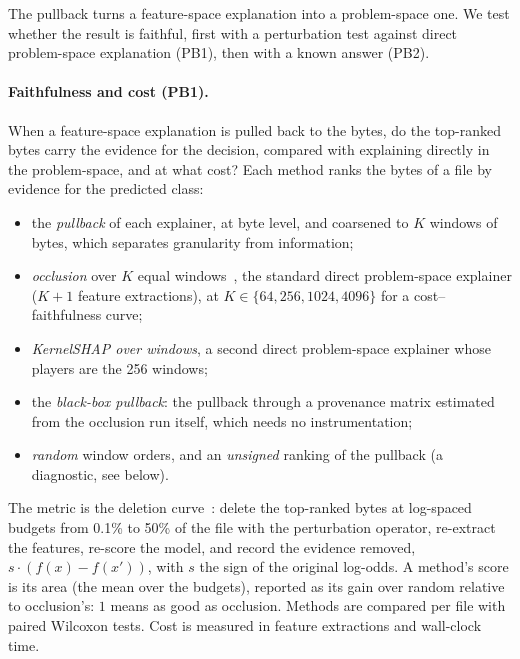 The pullback turns a feature-space explanation into a problem-space one. We test whether the result is faithful, first with a perturbation test against direct problem-space explanation (PB1), then with a known answer (PB2).

\paragraph{Faithfulness and cost (PB1).} When a feature-space explanation is pulled back to the bytes, do the top-ranked bytes carry the evidence for the decision, compared with explaining directly in the problem-space, and at what cost? Each method ranks the bytes of a file by evidence for the predicted class:
\begin{itemize}[noitemsep, topsep=2pt]
    \item the \textit{pullback} of each explainer, at byte level, and coarsened to $K$ windows of bytes, which separates granularity from information;
    \item \textit{occlusion} over $K$ equal windows~\cite{zeiler2014visualizing}, the standard direct problem-space explainer ($K + 1$ feature extractions), at $K \in \{64, 256, 1024, 4096\}$ for a cost--faithfulness curve;
    \item \textit{KernelSHAP over windows}, a second direct problem-space explainer whose players are the 256 windows;
    \item the \textit{black-box pullback}: the pullback through a provenance matrix estimated from the occlusion run itself, which needs no instrumentation;
    \item \textit{random} window orders, and an \textit{unsigned} ranking of the pullback (a diagnostic, see below).
\end{itemize}
The metric is the deletion curve~\cite{petsiuk2018rise}: delete the top-ranked bytes at log-spaced budgets from 0.1\% to 50\% of the file with the perturbation operator, re-extract the features, re-score the model, and record the evidence removed, $s \cdot (f(x) - f(x'))$, with $s$ the sign of the original log-odds. A method's score is its area (the mean over the budgets), reported as its gain over random relative to occlusion's: $1$ means as good as occlusion. Methods are compared per file with paired Wilcoxon tests. Cost is measured in feature extractions and wall-clock time.

